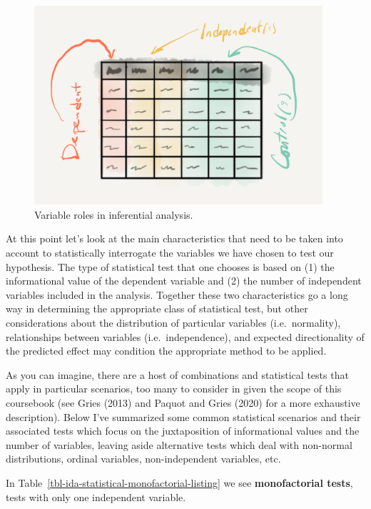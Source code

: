 \documentclass[
  letterpaper,
]{scrbook}
\begin{document}
\begin{figure}[h]

{\centering \includegraphics[width=4.21in,height=\textheight]{./figures/approaching-analysis/inferential-variables.png}

}

\caption{\label{fig-aa-inferential-variables}Variable roles in
inferential analysis.}

\end{figure}

At this point let's look at the main characteristics that need to be
taken into account to statistically interrogate the variables we have
chosen to test our hypothesis. The type of statistical test that one
chooses is based on (1) the informational value of the dependent
variable and (2) the number of independent variables included in the
analysis. Together these two characteristics go a long way in
determining the appropriate class of statistical test, but other
considerations about the distribution of particular variables
(i.e.~normality), relationships between variables (i.e.~independence),
and expected directionality of the predicted effect may condition the
appropriate method to be applied.

As you can imagine, there are a host of combinations and statistical
tests that apply in particular scenarios, too many to consider in given
the scope of this coursebook (see Gries (2013) and Paquot and Gries
(2020) for a more exhaustive description). Below I've summarized some
common statistical scenarios and their associated tests which focus on
the juxtaposition of informational values and the number of variables,
leaving aside alternative tests which deal with non-normal
distributions, ordinal variables, non-independent variables, etc.

In Table~\ref{tbl-ida-statistical-monofactorial-listing} we see
\textbf{monofactorial tests}, tests with only one independent variable.
\end{document}

